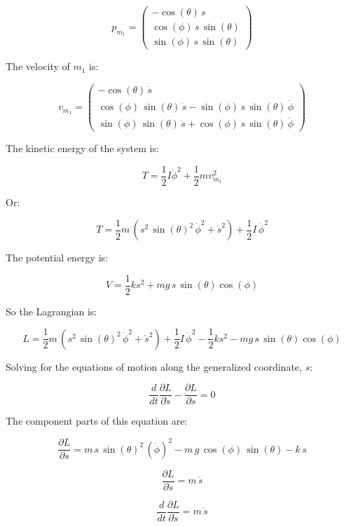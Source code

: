 \documentclass[12pt, letterpaper]{../assignment}
\begin{document}
$$ p_{m_1} = \left(\begin{array}{r} -\cos\left(\theta \right)\,s\\ \cos\left(\phi \right)\,s\,\sin\left(\theta \right)\\ \sin\left(\phi \right)\,s\,\sin\left(\theta \right) \end{array}\right) $$

The velocity of $m_1$ is:

$$ v_{m_1} = \left(\begin{array}{r} -\cos\left(\theta \right)\,\dot{s}\\ \cos\left(\phi \right)\,\sin\left(\theta \right)\,\dot{s}-\sin\left(\phi \right)\,s\,\sin\left(\theta \right)\,\dot{\phi} \\ \sin\left(\phi \right)\,\sin\left(\theta \right)\,\dot{s}+\cos\left(\phi \right)\,s\,\sin\left(\theta \right)\,\dot{\phi}  \end{array}\right) $$

The kinetic energy of the system is:

$$ T = \frac{1}{2} I \dot{\phi}^2 +\frac{1}{2} m v_{m_1}^2 $$

Or:

$$ T = \frac{1}{2}m\,{\left({s}^2 \,{\sin \left(\theta \right)}^2 \,{{\dot{\phi}}}^2 +{{\dot{s}}}^2 \right)}+\frac{1}{2}I\,{{\dot{\phi}}}^2  $$

The potential energy is:

$$ V = \frac{1}{2} k s^2 + m g\,s\,\sin(\theta)\cos(\phi)$$

So the Lagrangian is:

$$ L = \frac{1}{2}m\,{\left({s}^2 \,{\sin \left(\theta \right)}^2 \,{{\dot{\phi}}}^2 +{{\dot{s}}}^2 \right)}+\frac{1}{2}I\,{{\dot{\phi}}}^2  - \frac{1}{2} k s^2 - m g\,s\,\sin(\theta)\cos(\phi) $$

Solving for the equations of motion along the generalized coordinate, $s$:

$$ \frac{d}{d t} \frac{\partial L}{\partial \dot{s}} - \frac{\partial L}{\partial s} = 0 $$

The component parts of this equation are:

$$ \frac{\partial L}{\partial s} = 
m\,s\,{\sin \left(\theta \right)}^2 \,{{\left(\dot{\phi} \right)}}^2 -m\,g\,\cos \left(\phi \right)\,\sin \left(\theta \right)-k\,s $$

$$ \frac{\partial L}{\partial \dot{s}}  =
m\,\dot{s} $$

$$ \frac{d}{d t} \frac{\partial L}{\partial \dot{s}} =
m\,\ddot{s} $$
\end{document}

